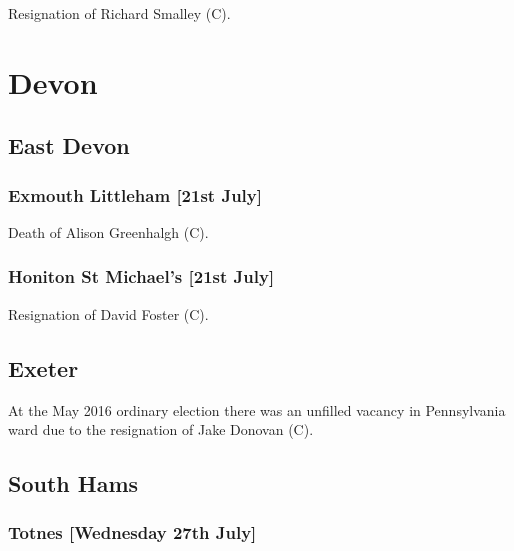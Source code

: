 \documentclass[a4paper,openany]{book}
\begin{document}
\begin{resultsiii}

Resignation of Richard Smalley (C).

\section{Devon}

\subsection*{East Devon}

\subsubsection*{Exmouth Littleham \hspace*{\fill}\nolinebreak[1]%
\enspace\hspace*{\fill}
[21st July]}


Death of Alison Greenhalgh (C).

\subsubsection*{Honiton St Michael's \hspace*{\fill}\nolinebreak[1]%
\enspace\hspace*{\fill}
[21st July]}


Resignation of David Foster (C).

\subsection*{Exeter}

At the May 2016 ordinary election there was an unfilled vacancy in Pennsylvania ward due to the resignation of Jake Donovan (C).

\subsection*{South Hams}

\subsubsection*{Totnes \hspace*{\fill}\nolinebreak[1]%
\enspace\hspace*{\fill}
[Wednesday 27th July]}


\end{resultsiii}
\end{document}
